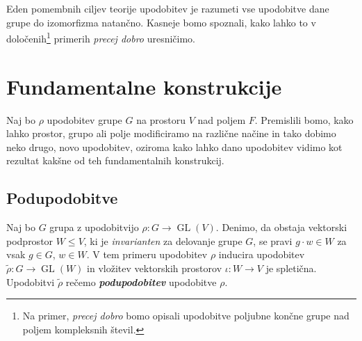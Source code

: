 \documentclass[11pt]{book}
\DeclareMathOperator\GL{GL}
\def\definicija{\color{rdeca}\bf\em}
\theoremstyle{definition}
\theoremstyle{zgled}
\theoremstyle{odprtproblem}
\theoremstyle{domacanaloga}
\theoremstyle{izrek}
\begin{document}
Eden pomembnih ciljev teorije upodobitev je razumeti vse upodobitve dane grupe do izomorfizma natančno. Kasneje bomo spoznali, kako lahko to v določenih\footnote{Na primer, \emph{precej dobro} bomo opisali upodobitve poljubne končne grupe nad poljem kompleksnih števil.} primerih \emph{precej dobro} uresničimo.

\section{Fundamentalne konstrukcije}

Naj bo $\rho$ upodobitev grupe $G$ na prostoru $V$ nad poljem $F$. Premislili bomo, kako lahko prostor, grupo ali polje modificiramo na različne načine in tako dobimo neko drugo, novo upodobitev, oziroma kako lahko dano upodobitev vidimo kot rezultat kakšne od teh fundamentalnih konstrukcij.


\subsection{Podupodobitve}

Naj bo $G$ grupa z upodobitvijo $\rho \colon G \to \GL(V)$. Denimo, da obstaja vektorski podprostor $W \leq V$, ki je \emph{invarianten} za delovanje grupe $G$, se pravi $g \cdot w \in W$ za vsak $g \in G$, $w \in W$. V tem primeru upodobitev $\rho$ inducira upodobitev $\tilde \rho \colon G \to \GL(W)$ in vložitev vektorskih prostorov $\iota \colon W \to V$ je spletična. Upodobitvi $\tilde \rho$ rečemo {\definicija podupodobitev} upodobitve $\rho$.
\end{document}
